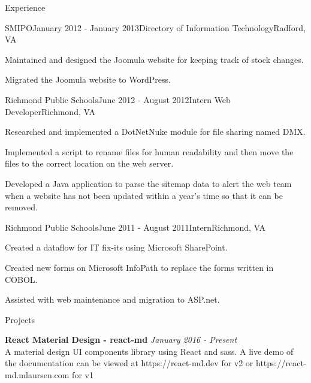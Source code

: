 \documentclass{resume} %
\begin{document}
\begin{rSection}{Experience}

\begin{rSubsection}{SMIPO}{January 2012 - January 2013}{Directory of Information Technology}{Radford, VA}
\item Maintained and designed the Joomula website for keeping track of stock changes.
\item Migrated the Joomula website to WordPress.
\end{rSubsection}


\begin{rSubsection}{Richmond Public Schools}{June 2012 - August 2012}{Intern Web Developer}{Richmond, VA}
\item Researched and implemented a DotNetNuke module for file sharing named DMX.
\item Implemented a script to rename files for human readability and then move the files to the correct location on the web server.
\item Developed a Java application to parse the sitemap data to alert the web team when a website has not been updated within a year's time so that it can be removed.
\end{rSubsection}


\begin{rSubsection}{Richmond Public Schools}{June 2011 - August 2011}{Intern}{Richmond, VA}
\item Created a dataflow for IT fix-its using Microsoft SharePoint.
\item Created new forms on Microsoft InfoPath to replace the forms written in COBOL.
\item Assisted with web maintenance and migration to ASP.net.
\end{rSubsection}

\end{rSection}

\begin{rSection}{Projects}

{\bf React Material Design - react-md} \hfill {\em January 2016 - Present} \\ 

A material design UI components library using React and sass. A live demo of the documentation can be viewed at https://react-md.dev for v2 or https://react-md.mlaursen.com for v1 \\

\end{rSection}
\end{document}
